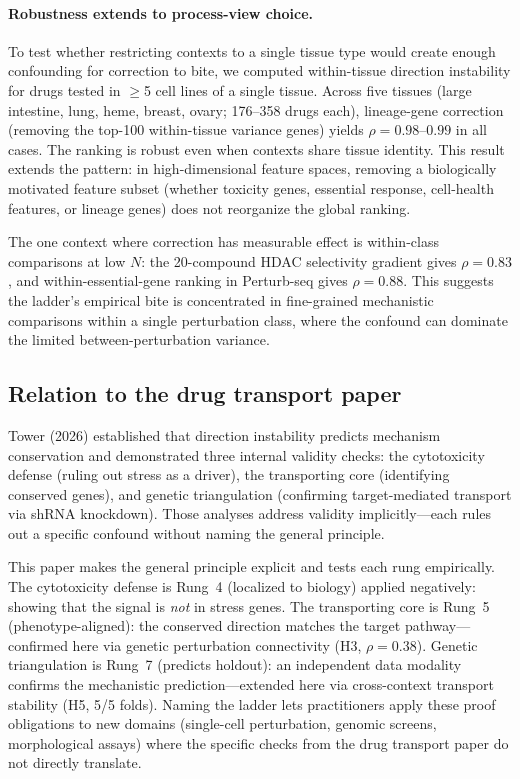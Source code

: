\documentclass{article}
\begin{document}
\paragraph{Robustness extends to process-view choice.}
To test whether restricting contexts to a single tissue type would create
enough confounding for correction to bite, we computed within-tissue
direction instability for drugs tested in $\geq$5 cell lines of a single
tissue. Across five tissues (large intestine, lung, heme, breast, ovary;
176--358 drugs each), lineage-gene correction (removing the top-100
within-tissue variance genes) yields $\rho = 0.98$--$0.99$ in all cases.
The ranking is robust even when contexts share tissue identity. This
result extends the pattern: in high-dimensional feature spaces, removing
a biologically motivated feature subset (whether toxicity genes, essential
response, cell-health features, or lineage genes) does not reorganize the
global ranking.

The one context where correction has measurable effect is within-class
comparisons at low $N$: the 20-compound HDAC selectivity gradient gives
$\rho = 0.83$, and within-essential-gene ranking in Perturb-seq gives $\rho
= 0.88$. This suggests the ladder's empirical bite is concentrated in
fine-grained mechanistic comparisons within a single perturbation class,
where the confound can dominate the limited between-perturbation variance.

\subsection{Relation to the drug transport paper}

Tower (2026) established that direction instability predicts mechanism
conservation and demonstrated three internal validity checks: the cytotoxicity
defense (ruling out stress as a driver), the transporting core (identifying
conserved genes), and genetic triangulation (confirming target-mediated
transport via shRNA knockdown). Those analyses address validity implicitly---each
rules out a specific confound without naming the general principle.

This paper makes the general principle explicit and tests each rung
empirically. The cytotoxicity defense is
Rung~4 (localized to biology) applied negatively: showing that the signal is
\emph{not} in stress genes. The transporting core is Rung~5 (phenotype-aligned):
the conserved direction matches the target pathway---confirmed here via
genetic perturbation connectivity (H3, $\rho = 0.38$). Genetic triangulation is
Rung~7 (predicts holdout): an independent data modality confirms the mechanistic
prediction---extended here via cross-context transport stability (H5, 5/5
folds). Naming the ladder lets practitioners apply these proof obligations
to new domains (single-cell perturbation, genomic screens, morphological
assays) where the specific checks from the drug transport paper do not
directly translate.
\end{document}
